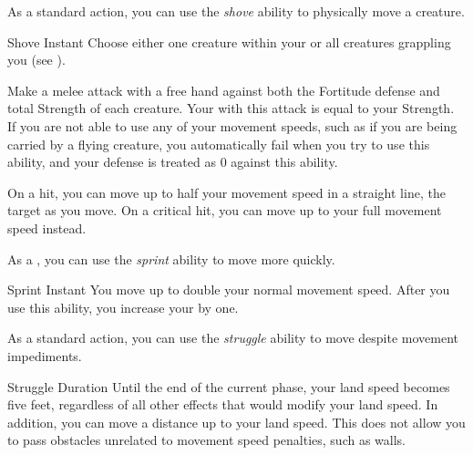          As a standard action, you can use the \textit{shove} ability to physically move a creature.

        \begin{instantability}{Shove}\label{Shove}
            Instant
            \rankline
            Choose either one creature within your  or all creatures grappling you (see ).

            Make a melee attack with a free hand against both the Fortitude defense and total Strength of each creature.
            Your  with this attack is equal to your Strength.
            If you are not able to use any of your movement speeds, such as if you are being carried by a flying creature, you automatically fail when you try to use this ability, and your defense is treated as 0 against this ability.

            On a hit, you can move up to half your movement speed in a straight line,  the target as you move.
            On a critical hit, you can move up to your full movement speed instead.
        \end{instantability}

         As a , you can use the \textit{sprint} ability to move more quickly.

        \begin{instantability}{Sprint}
            \label{Sprint}
            Instant
            \rankline
            You move up to double your normal movement speed.
            After you use this ability, you increase your  by one.
        \end{instantability}

         As a standard action, you can use the \textit{struggle} ability to move despite movement impediments.

        \begin{durationability}{Struggle}
            \label{Struggle}
            Duration
            \rankline
            Until the end of the current phase, your land speed becomes five feet, regardless of all other effects that would modify your land speed.
            In addition, you can move a distance up to your land speed.
            This does not allow you to pass obstacles unrelated to movement speed penalties, such as walls.
        \end{durationability}


